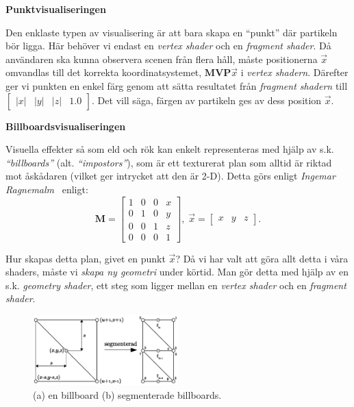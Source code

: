 \documentclass[a4paper]{article}
\begin{document}
\begin{multicols}{2}
\textbf{Punktvisualiseringen}

Den enklaste typen av visualisering är att bara skapa en ``punkt'' där partikeln bör ligga. Här behöver vi endast en \emph{vertex shader} och en \emph{fragment shader}. Då användaren ska kunna observera scenen från flera håll, måste positionerna \(\vec{x}\) omvandlas till det korrekta koordinatsystemet, \(\mathbf{MVP}\vec{x}\) i \emph{vertex shadern}. Därefter ger vi punkten en enkel färg genom att sätta resultatet från \emph{fragment shadern} till \(\begin{bmatrix}|x| & |y| & |z| & 1.0\end{bmatrix}\). Det vill säga, färgen av partikeln ges av dess position \(\vec{x}\).

\textbf{Billboardsvisualiseringen}

Visuella effekter så som eld och rök kan enkelt representeras med hjälp av s.k. \emph{``billboards''} (alt. \emph{``impostors''}), som är ett texturerat plan som alltid är riktad mot åskådaren (vilket ger intrycket att den är 2-D). Detta görs enligt \emph{Ingemar Ragnemalm}~\cite{ragnemalm2008polygons} enligt: \[\mathbf{M} = \begin{bmatrix} 1 & 0 & 0 & x \\
                                    0 & 1 & 0 & y \\
                                    0 & 0 & 1 & z \\
                                    0 & 0 & 0 & 1 \end{bmatrix}, \;
          \vec{x} = \begin{bmatrix}x & y & z\end{bmatrix}.\]

Hur skapas detta plan, givet en punkt \(\vec{x}\)? Då vi har valt att göra allt detta i våra shaders, måste vi \emph{skapa ny geometri} under körtid. Man gör detta med hjälp av en s.k. \emph{geometry shader}, ett steg som ligger mellan en \emph{vertex shader} och en \emph{fragment shader}.

\vspace{-0.3cm}
\begin{figure}[H]
\center
\includegraphics[width=0.5\textwidth]{share/Billboards.eps}
\caption{(a) en billboard (b) segmenterade billboards.}
\label{fig:bill}
\end{figure}
\vspace{-0.3cm}


\end{multicols}
\end{document}
